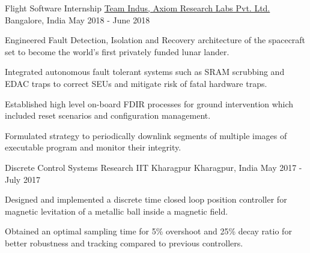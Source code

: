 

\begin{cventries}

  \cventry
    {Flight Software Internship} %
    {\href{https://www.teamindus.in/}{Team Indus, Axiom Research Labs Pvt. Ltd.}} %
    {Bangalore, India} %
    {May 2018 - June 2018} %
    {
      \begin{cvitems} %
      	\item {Engineered Fault Detection, Isolation and Recovery architecture of the spacecraft set to become the world's first privately funded lunar lander.}
        \item {Integrated autonomous fault tolerant systems such as SRAM scrubbing and EDAC traps to correct SEUs and mitigate risk of fatal hardware traps.}
        \item {Established high level on-board FDIR processes for ground intervention which included reset scenarios and configuration management.}
        \item{Formulated strategy to periodically downlink segments of multiple images of executable program and monitor their integrity.}
      \end{cvitems}
    }
    
    \cventry
    {Discrete Control Systems Research} %
    {IIT Kharagpur} %
    {Kharagpur, India} %
    {May 2017 - July 2017} %
    {
      \begin{cvitems} %
        \item {Designed and implemented a discrete time closed loop position controller for magnetic levitation of a metallic ball inside a magnetic field.}
        \item {Obtained an optimal sampling time for 5\% overshoot and 25\% decay ratio for better robustness and tracking compared to previous controllers.}
      \end{cvitems}
    }
    

\end{cventries}
